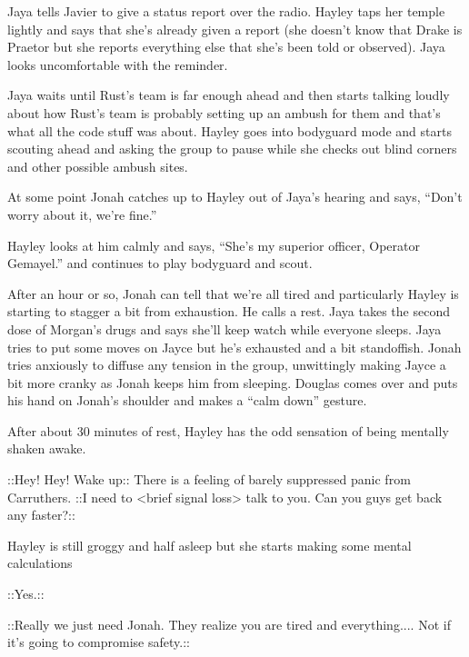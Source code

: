 Jaya tells Javier to give a status report over the radio.  Hayley taps her temple lightly and says that she's already given a report (she doesn't know that Drake is Praetor but she reports everything else that she's been told or observed).  Jaya looks uncomfortable with the reminder.



Jaya waits until Rust's team is far enough ahead and then starts talking loudly about how Rust's team is probably setting up an ambush for them and that's what all the code stuff was about.  Hayley goes into bodyguard mode and starts scouting ahead and asking the group to pause while she checks out blind corners and other possible ambush sites.



At some point Jonah catches up to Hayley out of Jaya's hearing and says, ``Don't worry about it, we're fine.''

Hayley looks at him calmly and says, ``She's my superior officer, Operator Gemayel.'' and continues to play bodyguard and scout.



After an hour or so, Jonah can tell that we're all tired and particularly Hayley is starting to stagger a bit from exhaustion.  He calls a rest.  Jaya takes the second dose of Morgan's drugs and says she'll keep watch while everyone sleeps.  Jaya tries to put some moves on Jayce but he's exhausted and a bit standoffish.  Jonah tries anxiously to diffuse any tension in the group, unwittingly making Jayce a bit more cranky as Jonah keeps him from sleeping.  Douglas comes over and puts his hand on Jonah's shoulder and makes a ``calm down'' gesture.



After about 30 minutes of rest, Hayley has the odd sensation of being mentally shaken awake.

 {\color[RGB]{153,0,255}::Hey!  Hey!  Wake up:: } There is a feeling of barely suppressed panic from Carruthers.  {\color[RGB]{153,0,255}::I need   to } \textless brief signal loss\textgreater  {\color[RGB]{153,0,255}  talk to you.  Can you guys get back any faster?:: } 

Hayley is still groggy and half asleep but she starts making some mental calculations

 {\color[RGB]{230,145,56}::Yes.::}  {\color[RGB]{255,153,0} } 

 {\color[RGB]{153,0,255}::Really we just need Jonah.  They realize you are tired and everything.... Not if it's going to  compromise safety.:: } 

